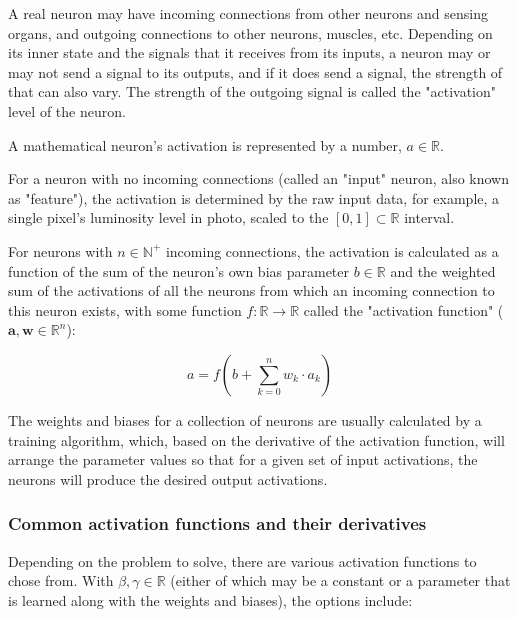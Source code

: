 \documentclass{article}
\begin{document}
      A real neuron may have incoming connections from other neurons and
      sensing organs, and outgoing connections to other neurons, muscles, etc.
      Depending on its inner state and the signals that it receives from its
      inputs, a neuron may or may not send a signal to its outputs, and if it
      does send a signal, the strength of that can also vary. The strength of
      the outgoing signal is called the "activation" level of the neuron.

      A mathematical neuron's activation is represented by a number,
      $a \in \mathbb{R}$.

      For a neuron with no incoming connections (called an "input" neuron, also
      known as "feature"), the activation is determined by the raw input data,
      for example, a single pixel's luminosity level in photo, scaled to the
      $[0, 1] \subset \mathbb{R}$ interval.

      For neurons with $n \in \mathbb{N}^+$ incoming connections, the
      activation is calculated as a function of the sum of the neuron's own
      bias parameter $b \in \mathbb{R}$ and the weighted sum of the activations
      of all the neurons from which an incoming connection to this neuron
      exists, with some function $f : \mathbb{R} \rightarrow \mathbb{R}$ called
      the "activation function" ($\mathbf{a}, \mathbf{w} \in \mathbb{R}^n$):

      \begin{equation}
        a = f \left( b + \sum_{k=0}^n w_k \cdot a_k \right)
      \end{equation}

      The weights and biases for a collection of neurons are usually calculated
      by a training algorithm, which, based on the derivative of the activation
      function, will arrange the parameter values so that for a given set of
      input activations, the neurons will produce the desired output
      activations.

      \subsubsection{Common activation functions and their derivatives}

        Depending on the problem to solve, there are various activation
        functions to chose from. With $\beta, \gamma \in \mathbb{R}$ (either of
        which may be a constant or a parameter that is learned along with the
        weights and biases), the options include:
\end{document}
